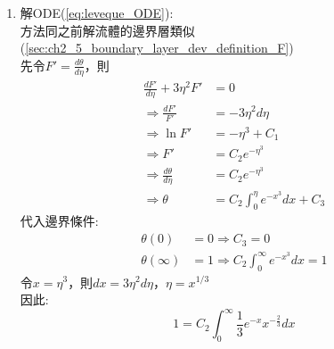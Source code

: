 \documentclass[../main.tex]{subfiles}
\begin{document}
\begin{itemize}
\begin{enumerate}
\begin{align}
      \right)^{-\frac{1}{3}} \frac{z^{\frac{1}{3}}}{y} \frac{d^2 \theta}{d\eta^2} \nonumber\\
      \Rightarrow& -\frac{1}{3}\eta \frac{d\theta}{d\eta} = \frac{1}{9}
      \underbrace{\left(
        \frac{4\rho \hat C_P \overline u_z}{9 k R}
      \right)^{-\frac{1}{3}} \frac{z^{\frac{1}{3}}}{y}}_{\frac{1}{\eta}} \frac{d^2 \theta}{d\eta^2} \nonumber\\
      \Rightarrow& -3\eta \frac{d\theta}{d\eta} = 
      \frac{1}{\eta} \frac{d^2 \theta}{d\eta^2} \nonumber\\
      \Rightarrow& -3\eta^2 \frac{d\theta}{d\eta} = 
       \frac{d^2 \theta}{d\eta^2} \label{eq:leveque_ODE}
    \end{align}
    所以最後的ODE變成:
    \begin{equation}
      \frac{d^2 \theta}{d\eta^2} + 3\eta^2 \frac{d\theta}{d\eta} = 0
    \end{equation}
    邊界條件變成:
    \begin{align}
      \theta(\infty) &= 1\\
      \theta(0) &= 0
    \end{align}
    \item 解ODE(\ref{eq:leveque_ODE}):\\
    方法同之前解流體的邊界層類似(\ref{sec:ch2_5_boundary_layer_dev_definition_F})\\
    先令$F'=\frac{d\theta}{d\eta}$，則
    \begin{align}
      \frac{dF'}{d\eta} + 3\eta^2 F' &= 0 \nonumber\\
      \Rightarrow \frac{dF'}{F'} &= -3\eta^2 d\eta \nonumber\\
      \Rightarrow \ln F' &= -\eta^3 + C_1 \nonumber\\
      \Rightarrow F' &= C_2 e^{-\eta^3} \nonumber\\
      \Rightarrow \frac{d\theta}{d\eta} &= C_2 e^{-\eta^3} \nonumber\\
      \Rightarrow \theta &= C_2 \int_0^\eta e^{-x^3} dx + C_3
    \end{align}
    代入邊界條件:
    \begin{align}
      \theta(0) &= 0 \Rightarrow C_3 = 0 \\
      \theta(\infty) &= 1 \Rightarrow C_2 \int_0^\infty e^{-x^3} dx = 1 
    \end{align}
    令$x=\eta^3$，則$dx = 3\eta^2 d\eta$，$\eta = x^{1/3}$\\
    因此:
    \begin{equation}
      1 = C_2 \int_0^\infty \frac{1}{3}e^{-x} x^{-\frac{2}{3}} dx

\end{equation}
\end{enumerate}
\end{itemize}
\end{document}
